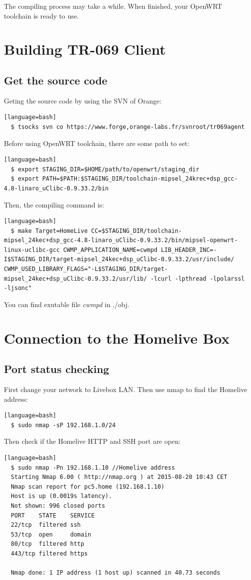 The compiling process may take a while. When finished, your OpenWRT toolchain is ready to use.

\section{Building TR-069 Client}
\subsection{Get the source code}
Geting the source code by using the SVN of Orange:
\begin{lstlisting}[style=DOS][language=bash]
  $ tsocks svn co https://www.forge,orange-labs.fr/svnroot/tr069agent
\end{lstlisting}


Before using OpenWRT toolchain, there are some path to set:
\begin{lstlisting}[style=DOS][language=bash]
  $ export STAGING_DIR=$HOME/path/to/openwrt/staging_dir
  $ export PATH=$PATH:$STAGING_DIR/toolchain-mipsel_24krec+dsp_gcc-4.8-linaro_uClibc-0.9.33.2/bin
\end{lstlisting}

Then, the compiling command is:
\begin{lstlisting}[style=DOS][language=bash]
  $ make Target=HomeLive CC=$STAGING_DIR/toolchain-mipsel_24kec+dsp_gcc-4.8-linaro_uClibc-0.9.33.2/bin/mipsel-openwrt-linux-uclibc-gcc CWMP_APPLICATION_NAME=cwmpd LIB_HEADER_INC=-I$STAGING_DIR/target-mipsel_24kec+dsp_uClibc-0.9.33.2/usr/include/ CWMP_USED_LIBRARY_FLAGS="-L$STAGING_DIR/target-mipsel_24kec+dsp_uClibc-0.9.33.2/usr/lib/ -lcurl -lpthread -lpolarssl -ljsonc"
\end{lstlisting}

You can find exutable file \textit{cwmpd} in ./obj.
\section{Connection to the Homelive Box}
\subsection{Port status checking}
First change your network to Livebox LAN. Then use nmap to find the Homelive address:
\begin{lstlisting}[style=DOS][language=bash]
  $ sudo nmap -sP 192.168.1.0/24
\end{lstlisting}
Then check if the Homelive HTTP and SSH port are open:
\begin{lstlisting}[style=DOS][language=bash]
  $ sudo nmap -Pn 192.168.1.10 //Homelive address
  Starting Nmap 6.00 ( http://nmap.org ) at 2015-08-20 10:43 CET
  Nmap scan report for pc5.home (192.168.1.10)
  Host is up (0.0019s latency).
  Not shown: 996 closed ports
  PORT    STATE    SERVICE
  22/tcp  filtered ssh
  53/tcp  open     domain
  80/tcp  filtered http
  443/tcp filtered https

  Nmap done: 1 IP address (1 host up) scanned in 40.73 seconds
\end{lstlisting}

